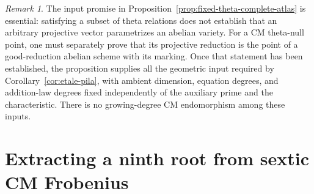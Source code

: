 \documentclass[11pt]{article}
\theoremstyle{definition}
\theoremstyle{remark}
\newtheorem{remark}[theorem]{Remark}
\begin{document}
\begin{remark}\label{rem:theta-atlas-reduction-scope}
The input promise in Proposition~\ref{prop:fixed-theta-complete-atlas}
is essential: satisfying a subset of theta relations does not establish
that an arbitrary projective vector parametrizes an abelian variety.
For a CM theta-null point, one must separately prove that its
projective reduction is the point of a good-reduction abelian scheme
with its marking. Once that statement has been established, the
proposition supplies all the geometric input required by
Corollary~\ref{cor:etale-pila}, with ambient dimension, equation degrees,
and addition-law degrees fixed independently of the auxiliary
prime and the characteristic. There is no growing-degree CM
endomorphism among these inputs.
\end{remark}

\section{Extracting a ninth root from sextic CM Frobenius}
\label{sec:sextic-cm-frobenius-output}
\end{document}
